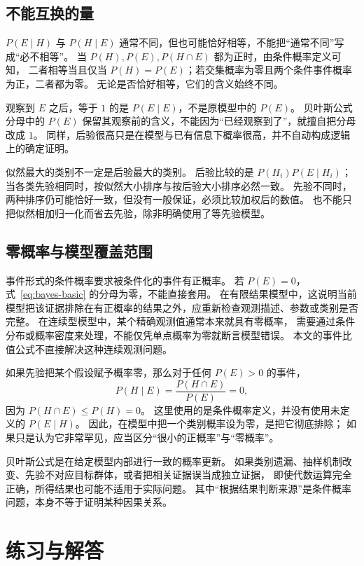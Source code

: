 \documentclass[UTF8]{ctexart}
\begin{document}
\subsection{不能互换的量}

$P(E\mid H)$ 与 $P(H\mid E)$ 通常不同，但也可能恰好相等，不能把“通常不同”写成“必不相等”。
当 $P(H),P(E),P(H\cap E)$ 都为正时，由条件概率定义可知，
二者相等当且仅当 $P(H)=P(E)$；若交集概率为零且两个条件事件概率为正，二者都为零。
无论是否恰好相等，它们的含义始终不同。

观察到 $E$ 之后，等于 $1$ 的是 $P(E\mid E)$，不是原模型中的 $P(E)$。
贝叶斯公式分母中的 $P(E)$ 保留其观察前的含义，不能因为“已经观察到了”，就擅自把分母改成 $1$。
同样，后验很高只是在模型与已有信息下概率很高，并不自动构成逻辑上的确定证明。

似然最大的类别不一定是后验最大的类别。
后验比较的是 $P(H_i)P(E\mid H_i)$；当各类先验相同时，按似然大小排序与按后验大小排序必然一致。
先验不同时，两种排序仍可能恰好一致，但没有一般保证，必须比较加权后的数值。
也不能只把似然相加归一化而省去先验，除非明确使用了等先验模型。

\subsection{零概率与模型覆盖范围}

事件形式的条件概率要求被条件化的事件有正概率。
若 $P(E)=0$，式~\eqref{eq:bayes-basic} 的分母为零，不能直接套用。
在有限结果模型中，这说明当前模型把该证据排除在有正概率的结果之外，应重新检查观测描述、参数或类别是否完整。
在连续型模型中，某个精确观测值通常本来就具有零概率，
需要通过条件分布或概率密度来处理，不能仅凭单点概率为零就断言模型错误。
本文的事件比值公式不直接解决这种连续观测问题。

如果先验把某个假设赋予概率零，那么对于任何 $P(E)>0$ 的事件，
\[
  P(H\mid E)=\frac{P(H\cap E)}{P(E)}=0,
\]
因为 $P(H\cap E)\leq P(H)=0$。
这里使用的是条件概率定义，并没有使用未定义的 $P(E\mid H)$。
因此，在模型中把一个类别概率设为零，是把它彻底排除；
如果只是认为它非常罕见，应当区分“很小的正概率”与“零概率”。

贝叶斯公式是在给定模型内部进行一致的概率更新。
如果类别遗漏、抽样机制改变、先验不对应目标群体，或者把相关证据误当成独立证据，
即使代数运算完全正确，所得结果也可能不适用于实际问题。
其中“根据结果判断来源”是条件概率问题，本身不等于证明某种因果关系。

\section{练习与解答}
\label{sec:bayes-exercises}
\end{document}
